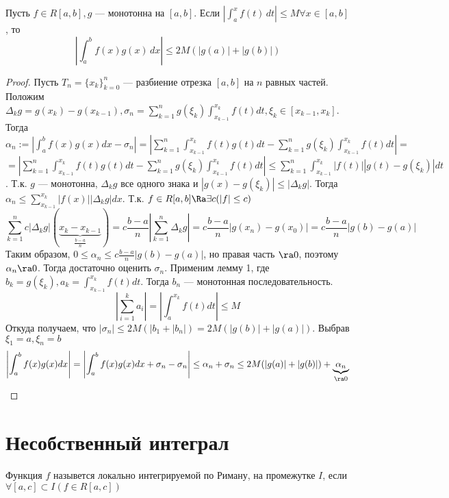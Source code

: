 \begin{lemma}[Абель]
    Пусть $f \in R[a, b], g$ --- монотонна на $[a, b]$. Если  $\left\lvert \int_{a}^{x} f(t) \,dt\right\rvert \le M \forall x \in [a, b]$, то 
    $$\left\lvert \int_{a}^{b} f(x)g(x) \,dx\right\rvert  \le 2M(|g(a)| + |g(b)|)$$
\end{lemma}
\begin{proof}
    Пусть $T_n = \{x_k\}_{k = 0}^n$ --- разбиение отрезка $[a, b]$ на $n$ равных частей. Положим $\Delta_kg = g(x_k) - g(x_{k-1}), \sigma_n = \sum_{k = 1}^{n} g(\xi_k)\int_{x_{k-1}}^{x_k}f(t)dt, \xi_k \in [x_{k-1}, x_k]$. 
    Тогда $\alpha_n := \left\lvert \int_{a}^{b}f(x)g(x)dx - \sigma_n\right\rvert = \left\lvert \sum_{k = 1}^{n}\int_{x_{k-1}}^{x_k}f(t)g(t)dt - \sum_{k = 1}^{n} g(\xi_k)\int_{x_{k-1}}^{x_k}f(t)dt\right\rvert = $ \newline $ = \left\lvert \sum_{k = 1}^{n}\int_{x_{k-1}}^{x_k}f(t)g(t)dt - \sum_{k = 1}^{n} g(\xi_k)\int_{x_{k-1}}^{x_k}f(t)dt\right\rvert \le \sum_{k = 1}^{n}\int_{x_{k-1}}^{x_k}|f(t)||g(t) - g(\xi_k)|dt$. Т.к. $g$ --- монотонна, $\Delta_kg$ все одного знака и $|g(x) - g(\xi_k)| \le |\Delta_kg|$. Тогда $\alpha_n \le \sum_{x_{k - 1}}^{x_k}|f(x)||\Delta_kg|dx$. Т.к. $f \in R[a, b] \Ra \exists c (|f| \le c)$
    $$\sum_{k = 1}^nc|\Delta_kg|(\underbrace{x_k - x_{k-1}}_{\frac{b - a}{n}}) = c\frac{b - a}{n}\left\lvert \sum_{k  =1}^{n} \Delta_kg\right\rvert = c\frac{b - a}{n}|g(x_n) - g(x_0)| = c\frac{b - a}{n}|g(b) - g(a)|$$
    Таким образом, $0 \le \alpha_n \le c\frac{b - a}{n}|g(b) - g(a)|$, но правая часть $\ra 0$, поэтому $\alpha_n \ra 0$. Тогда достаточно оценить $\sigma_n$. Применим лемму 1, где $b_k = g(\xi_k), a_k = \int_{x_{k-1}}^{x_k}f(t)dt$. Тогда $b_n$ --- монотонная последовательность.
    $$\left\lvert \sum_{i = 1}^{k} a_i\right\rvert = \left\lvert \int_{a}^{x_k}f(t)dt\right\rvert 
    \le M$$
    Откуда получаем, что $|\sigma_n| \le 2M(|b_1 + |b_n|) = 2M(|g(b)| + |g(a)|)$. Выбрав $\xi_1 = a, \xi_n = b$
    $$\left\lvert \int_{a}^{b}f(x)g(x)dx \right\rvert = \left\lvert \int_{a}^{b}f(x)g(x)dx + \sigma_n - \sigma_n\right\rvert \le \alpha_n + \sigma_n \le 2M(|g(a)| + |g(b)|) + \underbrace{\alpha_n}_{\ra 0}$$
\end{proof}

\section{Несобственный интеграл}
\begin{definition}
    Функция $f$ назывется локально интегрируемой по Риману, на промежутке $I$, если $\forall [a, c] \subset I (f \in R[a, c])$
\end{definition}

